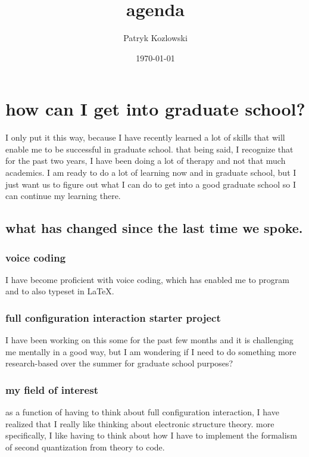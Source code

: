 \documentclass[12pt]{article}
\title{agenda}
\author{Patryk Kozlowski}
\date{\today}
\begin{document}
\maketitle
\section{how can I get into graduate school?}
I only put it this way, because I have recently learned a lot of skills that will enable me to be successful in graduate school. that being said, I recognize that for the past two years, I have been doing a lot of therapy and not that much academics. I am ready to do a lot of learning now and in graduate school, but I just want us to figure out what I can do to get into a good graduate school so I can continue my learning there.
\subsection{what has changed since the last time we spoke.}
\subsubsection{voice coding}
I have become proficient with voice coding, which has enabled me to program and to also typeset in LaTeX. 
\subsubsection{full configuration interaction starter project}
I have been working on this some for the past few months and it is challenging me mentally in a good way, but I am wondering if I need to do something more research-based over the summer for graduate school purposes?
\subsubsection{my field of interest}
as a function of having to think about full configuration interaction, I have realized that I really like thinking about electronic structure theory. more specifically, I like having to think about how I have to implement the formalism of second quantization from theory to code.
\end{document}
